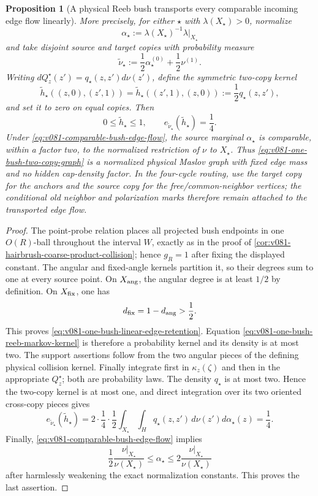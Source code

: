 \documentclass[10pt]{article}
\newtheorem{proposition}[theorem]{Proposition}
\begin{document}
\begin{proposition}[A physical Reeb bush transports every comparable incoming edge flow linearly]
More precisely, for either \(\star\) with \(\lambda(X_\star)>0\), normalize
\[
\alpha_\star:=\lambda(X_\star)^{-1}\lambda|_{X_\star}
\]
and take disjoint source and target copies with probability measure
\[
\widetilde\nu_\star
:=
\frac12\alpha_\star^{(0)}+\frac12\nu^{(1)}.
\]
Writing \(dQ_z^\star(z')=q_\star(z,z')d\nu(z')\), define the symmetric two-copy kernel
\[
\widetilde h_\star((z,0),(z',1))
=
\widetilde h_\star((z',1),(z,0))
:=
\frac12q_\star(z,z'),
\]
and set it to zero on equal copies.  Then
\begin{equation}
\label{eq:v081-one-bush-two-copy-graph}
\boxed{
0\le\widetilde h_\star\le1,
\qquad
e_{\widetilde\nu_\star}(\widetilde h_\star)=\frac14.
}
\end{equation}
Under \eqref{eq:v081-comparable-bush-edge-flow}, the source marginal
\(\alpha_\star\) is comparable, within a factor two, to the normalized restriction of \(\nu\) to
\(X_\star\).  Thus \eqref{eq:v081-one-bush-two-copy-graph} is a normalized physical Maslov graph
with fixed edge mass and no hidden cap-density factor.  In the four-cycle routing, use the target
copy for the anchors and the source copy for the free/common-neighbor vertices; the conditional old
neighbor and polarization marks therefore remain attached to the transported edge flow.
\end{proposition}

\begin{proof}
The point-probe relation places all projected bush endpoints in one \(O(R)\)-ball throughout the
interval \(W\), exactly as in the proof of
\cref{cor:v081-hairbrush-coarse-product-collision}; hence \(g_R=1\) after fixing the displayed
constant.  The angular and fixed-angle kernels partition it, so their degrees sum to one at every
source point.  On \(X_{\rm ang}\), the angular degree is at least \(1/2\) by definition.  On
\(X_{\rm fix}\), one has
\[
d_{\rm fix}=1-d_{\rm ang}>\frac12.
\]
This proves \eqref{eq:v081-one-bush-linear-edge-retention}.  Equation
\eqref{eq:v081-one-bush-reeb-markov-kernel} is therefore a probability kernel and its density is at
most two.  The support assertions follow from the two
angular pieces of the defining physical collision kernel.  Finally integrate first in
\(\kappa_z(\zeta)\) and then in the appropriate \(Q_z^\star\); both are probability laws.
The density \(q_\star\) is at most two.  Hence the two-copy kernel is at most one, and direct
integration over its two oriented cross-copy pieces gives
\[
e_{\widetilde\nu_\star}(\widetilde h_\star)
=
2\cdot\frac14\cdot\frac12
\int_{X_\star}\int_Hq_\star(z,z')\,d\nu(z')d\alpha_\star(z)
=
\frac14.
\]
Finally, \eqref{eq:v081-comparable-bush-edge-flow} implies
\[
\frac12
\frac{\nu|_{X_\star}}{\nu(X_\star)}
\le
\alpha_\star
\le
2
\frac{\nu|_{X_\star}}{\nu(X_\star)}
\]
after harmlessly weakening the exact normalization constants.  This proves the last assertion.
\end{proof}
\end{document}
